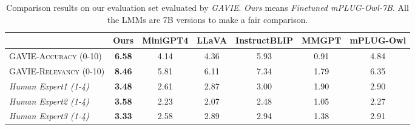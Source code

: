 \begin{table}[t]
\setlength\tabcolsep{3pt}
\centering
\small
\begin{tabular}{lcccccc}
\toprule[1.5pt]
& \textbf{Ours} & MiniGPT4 & LLaVA & InstructBLIP & MMGPT &mPLUG-Owl\\
\midrule
\textsc{GAVIE-Accuracy (0-10)} & \textbf{6.58} & 4.14 & 4.36 & 5.93 & 0.91 & 4.84\\
\textsc{GAVIE-Relevancy (0-10)} & \textbf{8.46} & 5.81 & 6.11 & 7.34 & 1.79& 6.35\\
\midrule
\textit{Human Expert1 (1-4)}& \textbf{3.48} & 2.61 & 2.87 & 3.00 & 1.90& 2.90\\
\textit{Human Expert2 (1-4)} &\textbf{3.58}& 2.23& 2.07& 2.48& 1.05& 2.27\\
\textit{Human Expert3 (1-4)} & \textbf{3.33} & 2.58 & 2.89 & 2.94 & 1.38& 2.91\\
\bottomrule[1.5pt]
\end{tabular}
\vspace{2mm}
\caption{
Comparison results on our evaluation set evaluated by \textit{GAVIE}. \textit{Ours} means \textit{Finetuned mPLUG-Owl-7B}. All the LMMs are 7B versions to make a fair comparison. 
}
\label{tab:comparison_evaluation}
\end{table}







